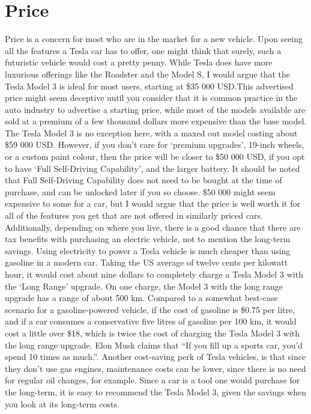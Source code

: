 \documentclass{IEEEtran}
\begin{document}
  \section{Price}
  Price is a concern for most who are in the market for a new vehicle. Upon seeing
  all the features a Tesla car has to offer, one might think that surely,
  such a futuristic vehicle would cost a pretty penny. While Tesla does have
  more luxurious offerings like the Roadster and the Model S, I would argue that the
  Tesla Model 3 is ideal for most users, starting at \$35 000 USD.\@ This advertised
  price might seem deceptive until you consider that it is common practice
  in the auto industry to advertise a starting price, while most of the models available
  are sold at a premium of a few thousand dollars more expensive than the base model. The
  Tesla Model 3 is no exception here, with a maxed out model costing about
  \$59 000 USD\cite{maxprice}. However, if you don't care for `premium upgrades',
  19-inch wheels, or a custom paint colour, then the price will be closer to
  \$50 000 USD, if you opt to have `Full Self-Driving Capability', and the larger
  battery. It should be noted that Full Self-Driving Capability does not need to be
  bought at the time of purchase, and can be unlocked later if you so choose.
  \$50 000 might seem expensive to some for a car, but I would argue that the price is well worth
  it for all of the features you get that are not offered in similarly priced cars.
  Additionally, depending on where you live, there is a good chance that there are
  tax benefits with purchasing an electric vehicle, not to mention the long-term savings.
  Using electricity to power a Tesla vehicle is much cheaper than using gasoline in
  a modern car. Taking the US average of twelve cents per kilowatt hour, it would
  cost about nine dollars to completely charge a Tesla Model 3 with the `Long Range'
  upgrade. On one charge, the Model 3 with the long range upgrade has a range of about
  500 km\cite{500km}. Compared to a somewhat best-case scenario for a gasoline-powered vehicle,
  if the cost of gasoline is \$0.75 per litre\cite{75cents}, and if a car consumes a conservative five
  litres of gasoline per 100 km\cite{priusmpg}, it would cost a little over \$18, which is
  twice the cost of charging the Tesla Model 3 with the long range upgrade. Elon Musk claims that
  ``If you fill up a sports car, you'd spend 10 times as much.''\cite{rosoff_elon_nodate}. Another cost-saving
  perk of Tesla vehicles, is that since they don't use gas engines, maintenance costs
  can be lower, since there is no need for regular oil changes, for example.\cite{oilchange}
  Since a car is a tool one would purchase for the long-term, it is easy to
  recommend the Tesla Model 3, given the savings when you look at its long-term costs.
\end{document}
